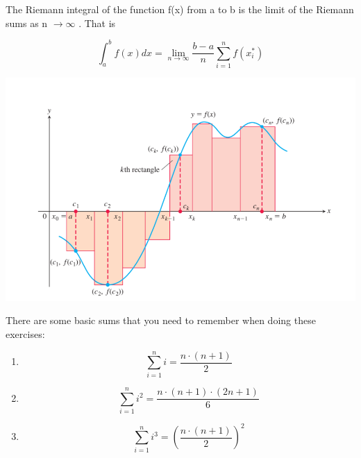 \documentclass{article}
\begin{document}
The Riemann integral of the function f(x) from a to b is the
limit of the Riemann sums as n $\to \infty$ . That is

$$ \int_{a}^{b} f(x) dx = \lim_{n \to \infty} \frac{b-a}{n} \sum_{i=1}^{n} f(x_i^*)$$

\begin{center}
    \includegraphics[scale=0.5]{image_2023-12-18_214927179.png}
\end{center}
\pagebreak
There are some basic sums that you need to remember when doing these exercises:
\begin{enumerate}
    \item $$\sum_{i=1}^{n} i = \frac{n \cdot (n+1)}{2}$$
    \item $$\sum_{i=1}^{n} i^2 = \frac{n \cdot (n+1) \cdot(2n+1)}{6}$$
    \item $$\sum_{i=1}^{n} i^3 = \left(\frac{n \cdot (n+1)}{2}\right)^2$$
\end{enumerate}
\end{document}
